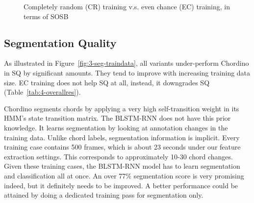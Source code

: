 \begin{figure}[htb]
\centering
{}
\caption{Completely random (CR) training v.s. even chance (EC) training, in terms of SOSB}
\label{fig:3-EC-SOSB}
\end{figure}

\subsection{Segmentation Quality}
As illustrated in Figure~\ref{fig:3-seg-traindata}, all variants under-perform Chordino in SQ by significant amounts. They tend to improve with increasing training data size. EC training does not help SQ at all, instead, it downgrades SQ (Table~\ref{tab:4-overallres}).

Chordino segments chords by applying a very high self-transition weight in its HMM's state transition matrix. The BLSTM-RNN does not have this prior knowledge. It learns segmentation by looking at annotation changes in the training data. Unlike chord labels, segmentation information is implicit. Every training case contains 500 frames, which is about 23 seconds under our feature extraction settings. This corresponds to approximately 10-30 chord changes. Given these training cases, the BLSTM-RNN model has to learn segmentation and classification all at once. An over 77\% segmentation score is very promising indeed, but it definitely needs to be improved. A better performance could be attained by doing a dedicated training pass for segmentation only.

